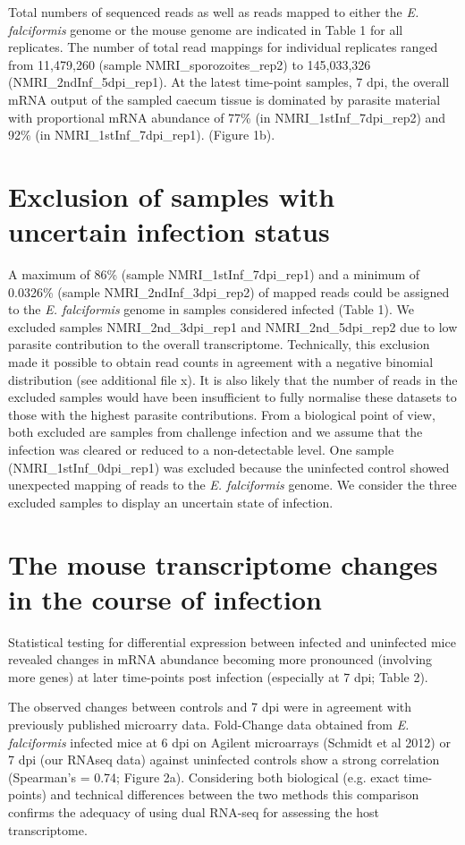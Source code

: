 \documentclass{bmcart}
\begin{document}
Total numbers of sequenced reads as well as reads
mapped to either the \textit{E. falciformis} genome or the
mouse genome are indicated in Table 1 for all replicates. The number of total read mappings 
for individual replicates ranged from 11,479,260 (sample NMRI\_sporozoites\_rep2) to 145,033,326
(NMRI\_2ndInf\_5dpi\_rep1). At the latest time-point samples, 7 dpi, the overall mRNA
output of the sampled caecum tissue is dominated by parasite material with proportional mRNA
abundance of 77\% (in NMRI\_1stInf\_7dpi\_rep2) and 92\% (in
NMRI\_1stInf\_7dpi\_rep1). (Figure 1b). 

\section*{Exclusion of samples with uncertain infection status}
A maximum of 86\% (sample NMRI\_1stInf\_7dpi\_rep1) and a minimum of
0.0326\% (sample NMRI\_2ndInf\_3dpi\_rep2) of mapped reads could be
assigned to the \textit{E. falciformis} genome in samples considered
infected (Table 1). We excluded samples NMRI\_2nd\_3dpi\_rep1 and NMRI\_2nd\_5dpi\_rep2
due to low parasite contribution to the overall transcriptome. 
Technically, this exclusion made it possible to obtain read counts in agreement with a 
negative binomial distribution (see additional file x). It is also likely that the number of reads in the excluded samples would have been
insufficient to fully normalise these datasets to those with the highest parasite contributions.
From a biological point of view, both excluded are samples from challenge
infection and we assume that the infection was cleared or reduced to a
non-detectable level. One sample (NMRI\_1stInf\_0dpi\_rep1) was excluded because
the uninfected control showed unexpected mapping of reads to the
\textit{E. falciformis} genome. We consider the three excluded samples to display an uncertain 
state of infection.

\section*{The mouse transcriptome changes in the course of infection}
Statistical testing for differential expression between infected and
uninfected mice revealed changes in mRNA abundance becoming more
pronounced (involving more genes) at later time-points post infection (especially
at 7 dpi; Table 2).

The observed changes between controls and 7 dpi were in agreement with
previously published microarry data. Fold-Change data obtained from
\textit{E. falciformis} infected mice at 6 dpi on Agilent microarrays 
(Schmidt et al 2012) or 7 dpi (our RNAseq data) against uninfected controls
show a strong correlation (Spearman's \rho = 0.74; Figure 2a). Considering both biological 
(e.g. exact time-points) and technical differences between the two methods this comparison 
confirms the adequacy of using dual RNA-seq for assessing the host transcriptome.
\end{document}
